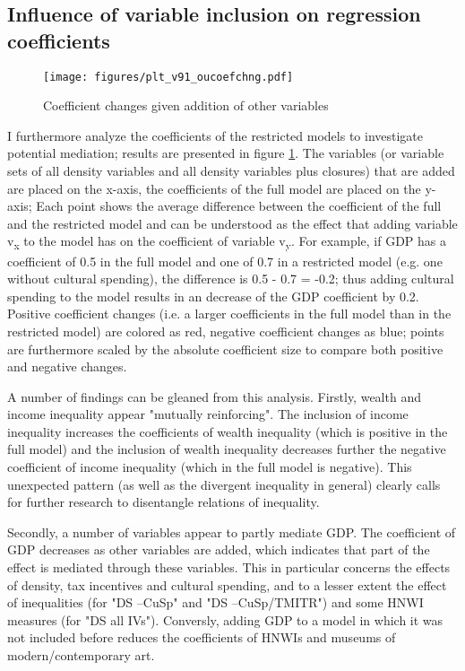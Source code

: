 \documentclass[11pt]{article}
\begin{document}
\subsection{Influence of variable inclusion on regression coefficients}
\label{app_mediation}
\begin{landscape}

\begin{figure}[htbp]
\centering
\texttt{[image: figures/plt\_v91\_oucoefchng.pdf]}
\caption{\label{fig:oucoefchng}Coefficient changes given addition of other variables}
\end{figure}

\end{landscape}

I furthermore analyze the coefficients of the restricted models to investigate potential mediation; results are presented in figure \ref{fig:oucoefchng}.
The variables (or variable sets of all density variables and all density variables plus closures) that are added are placed on the x-axis, the coefficients of the full model are placed on the y-axis;
Each point shows the average difference between the coefficient of the full and the restricted model and can be understood as the effect that adding variable v\textsubscript{x} to the model has on the coefficient of variable v\textsubscript{y}.
For example, if GDP has a coefficient of 0.5 in the full model and one of 0.7 in a restricted model (e.g. one without cultural spending), the difference is 0.5 - 0.7 = -0.2; thus adding cultural spending to the model results in an decrease of the GDP coefficient by 0.2. 
Positive coefficient changes (i.e. a larger coefficients in the full model than in the restricted model) are colored as red, negative coefficient changes as blue; points are furthermore scaled by the absolute coefficient size to compare both positive and negative changes. 


A number of findings can be gleaned from this analysis.
Firstly, wealth and income inequality appear "mutually reinforcing".
The inclusion of income inequality increases the coefficients of wealth inequality (which is positive in the full model) and the inclusion of wealth inequality decreases further the negative coefficient of income inequality (which in the full model is negative).
This unexpected pattern (as well as the divergent inequality in general) clearly calls for further research to disentangle relations of inequality.


Secondly, a number of variables appear to partly mediate GDP.
The coefficient of GDP decreases as other variables are added, which indicates that part of the effect is mediated through these variables.
This in particular concerns the effects of density, tax incentives and cultural spending, and to a lesser extent the effect of inequalities (for "DS --CuSp" and "DS --CuSp/TMITR") and some HNWI measures (for "DS all IVs").
Conversly, adding GDP to a model in which it was not included before reduces the coefficients of HNWIs and museums of modern/contemporary art.
\end{document}
